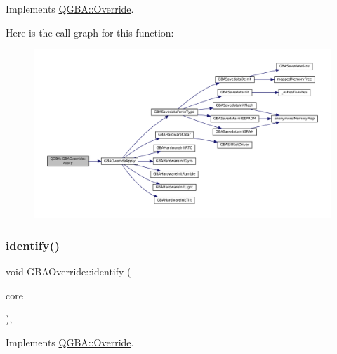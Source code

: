Implements \mbox{\hyperlink{class_q_g_b_a_1_1_override_af7d6d72e9344c21b6133a18240ac0935}{Q\+G\+B\+A\+::\+Override}}.

Here is the call graph for this function\+:
\nopagebreak
\begin{figure}[H]
\begin{center}
\leavevmode
\includegraphics[width=350pt]{class_q_g_b_a_1_1_g_b_a_override_a3d8805aff62b8b92349610054bc85bf3_cgraph}
\end{center}
\end{figure}
\mbox{\label{class_q_g_b_a_1_1_g_b_a_override_a14151061a9f7a9b9c6233c93f554b35b}} 
\subsubsection{\texorpdfstring{identify()}{identify()}}
{\footnotesize\ttfamily void G\+B\+A\+Override\+::identify (\begin{DoxyParamCaption}\item[{const struct m\+Core $\ast$}]{core }\end{DoxyParamCaption})\hspace{0.3cm}{\ttfamily [override]}, {\ttfamily [virtual]}}



Implements \mbox{\hyperlink{class_q_g_b_a_1_1_override_aac1ad966769d5424736654fdc69a3725}{Q\+G\+B\+A\+::\+Override}}.

\mbox{\label{class_q_g_b_a_1_1_g_b_a_override_ac998ad9838873fb7beeeb3cd741856d0}} 
